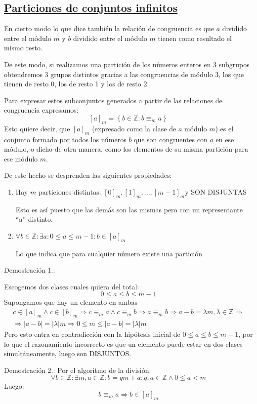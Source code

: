 \documentclass[10pt,a4paper,openright]{book}
\begin{document}
\subsection*{\underline{Particiones de conjuntos infinitos}}
En cierto modo lo que dice también la relación de congruencia es que $a$ dividido entre el módulo $m$ y $b$ dividido entre el módulo $m$ tienen como resultado el mismo resto.\par
De este modo, si realizamos una partición de los números enteros en 3 subgrupos obtendremos 3 grupos distintos gracias a las congruencias de módulo 3, los que tienen de resto 0, los de resto 1 y los de resto 2.\par
Para expresar estos subconjuntos generados a partir de las relaciones de congruencia expresamos:
$$[a]_m=\left\lbrace b \in \mathbb Z : b\equiv_m a\right\rbrace$$
Esto quiere decir, que $[a]_m$ (expresado como la clase de $a$ módulo $m$) es el conjunto formado por todos los números $b$ que son congruentes con $a$ en ese módulo, o dicho de otra manera, como los elementos de su misma partición para ese módulo $m$.\par
De este hecho se desprenden las siguientes propiedades:
\begin{enumerate}
\item Hay $m$ particiones distintas: $[0]_m, [1]_m, ..., [m-1]_m$y SON DISJUNTAS\par
Esto es así puesto que las demás son las mismas pero con un representante ``a'' distinto.
\item $\forall b\in \mathbb Z : \exists a : 0\leq a\leq m-1: b\in [a]_m$\par
Lo que indica que para cualquier número existe una partición
\end{enumerate}

Demostración 1.:\par
Escogemos dos clases cuales quiera del total:
$$0\leq a\leq b \leq m-1$$
Supongamos que hay un elemento en ambas
\begin{gather*}
c\in [a]_m \wedge c\in [b]_m\Rightarrow c\equiv_m a \wedge c\equiv_m b\Rightarrow a\equiv_m b\Rightarrow a-b=\lambda m, \lambda \in \mathbb Z \Rightarrow \\
\Rightarrow |a-b|=|\lambda|m \Rightarrow 0\leq m\leq |a-b|=|\lambda|m
\end{gather*}
Pero esto entra en contradicción con la hipótesis inicial de $0\leq a\leq b \leq m-1$, por lo que el razonamiento incorrecto es que un elemento puede estar en dos clases simultáneamente, luego son DISJUNTOS.\par
Demostración 2.:
Por el algoritmo de la división:
$$\forall b \in \mathbb Z : \exists m,a \in \mathbb Z : b=qm+a: q,a\in \mathbb Z \wedge 0\leq a<m$$
Luego:
$$b\equiv_m a\Rightarrow b\in [a]_m$$
\end{document}
